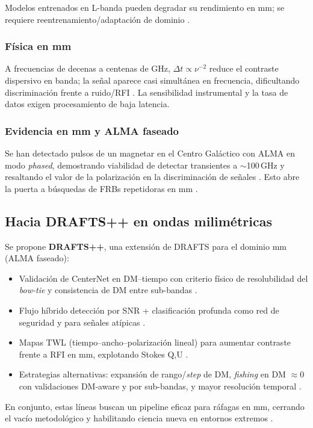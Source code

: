 Modelos entrenados en L-banda pueden degradar su rendimiento en mm; 
se requiere reentrenamiento/adaptación de dominio \citep{zhang2024drafts}.

\subsubsection{Física en mm} 

A frecuencias de decenas a centenas de GHz, $\Delta t\propto \nu^{-2}$ reduce el 
contraste dispersivo en banda; la señal aparece casi simultánea en frecuencia, 
dificultando discriminación frente a ruido/RFI \citep{LorimerKramer2004,CordesChatterjee2019}. 
La sensibilidad instrumental y la tasa de datos exigen procesamiento de baja latencia.

\subsubsection{Evidencia en mm y ALMA faseado} 

Se han detectado pulsos de un magnetar en el Centro Galáctico con ALMA en modo 
\textit{phased}, demostrando viabilidad de detectar transientes a $\sim$100\,GHz y 
resaltando el valor de la polarización en la discriminación de señales 
\citep{Matthews2018,veracasanova2025}. Esto abre la puerta a búsquedas de FRBs repetidoras en mm 
\citep{veracasanova2025}.

\subsection{Hacia DRAFTS++ en ondas milimétricas}

Se propone \textbf{DRAFTS++}, una extensión de DRAFTS para el dominio mm (ALMA faseado):
\begin{itemize}
  \item Validación de CenterNet en DM--tiempo con criterio físico de resolubilidad del 
  \textit{bow-tie} y consistencia de DM entre sub-bandas \citep{zhang2024drafts}.
  \item Flujo híbrido detección por SNR + clasificación profunda como red de 
  seguridad y para señales atípicas \citep{Agarwal_2020,zhang2024drafts}.
  \item Mapas TWL (tiempo--ancho--polarización lineal) para aumentar contraste frente a RFI en mm, 
  explotando Stokes Q,U \citep{hamaker1996understanding,veracasanova2025}.
  \item Estrategias alternativas: expansión de rango/\textit{step} de DM, \textit{fishing} en DM 
  $\approx 0$ con validaciones DM-aware y por sub-bandas, y mayor resolución temporal 
  \citep{LorimerKramer2004,zhang2024drafts}.
\end{itemize}

En conjunto, estas líneas buscan un pipeline eficaz para ráfagas en mm, cerrando el 
vacío metodológico y habilitando ciencia nueva en entornos extremos 
\citep{Zhang_2020,Matthews2018,veracasanova2025}.

